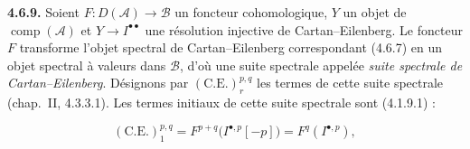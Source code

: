 \medskip\noindent\textbf{4.6.9.}\quad
Soient $F\colon D(\mathcal A)\longrightarrow\mathcal B$ un foncteur
cohomologique, $Y$ un objet de $\operatorname{comp}(\mathcal A)$ et
$Y\longrightarrow I^{\bullet\bullet}$ une résolution injective de
Cartan--Eilenberg. Le foncteur $F$ transforme l'objet spectral de
Cartan--Eilenberg correspondant (4.6.7) en un objet spectral à valeurs dans
$\mathcal B$, d'où une suite spectrale appelée \emph{suite spectrale de
Cartan--Eilenberg}. Désignons par $(\mathrm{C.E.})_r^{p,q}$ les termes de
cette suite spectrale (chap.~II, 4.3.3.1). Les termes initiaux de cette
suite spectrale sont (4.1.9.1) :

\[
(\mathrm{C.E.})_1^{p,q}
=F^{p+q}\bigl(I^{\bullet,p}[-p]\bigr)
=F^q(I^{\bullet,p}),
\]
\endgroup
